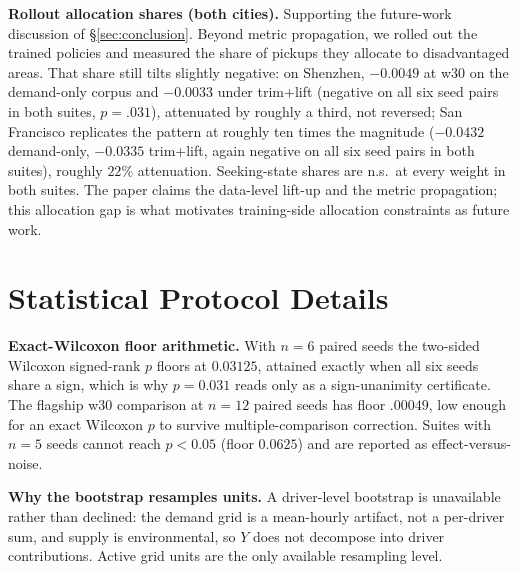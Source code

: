 \textbf{Rollout allocation shares (both cities).} Supporting the future-work
discussion of \S\ref{sec:conclusion}. Beyond metric propagation, we rolled
out the trained policies and measured the share of pickups they allocate to
disadvantaged areas. That share still tilts slightly negative: on Shenzhen,
$-0.0049$ at w30 on the demand-only corpus and $-0.0033$ under trim+lift
(negative on all six seed pairs in both suites, $p = .031$), attenuated by
roughly a third, not reversed; San Francisco replicates the pattern at
roughly ten times the magnitude ($-0.0432$ demand-only, $-0.0335$
trim+lift, again negative on all six seed pairs in both suites), roughly
$22\%$ attenuation. Seeking-state shares are n.s.\ at every weight in both
suites. The paper claims the data-level lift-up and the metric propagation;
this allocation gap is what motivates training-side allocation constraints
as future work.

\section{Statistical Protocol Details}\label{app:protocol}

\textbf{Exact-Wilcoxon floor arithmetic.} With $n = 6$ paired seeds the
two-sided Wilcoxon signed-rank $p$ floors at $0.03125$, attained exactly
when all six seeds share a sign, which is why $p = 0.031$ reads only as a
sign-unanimity certificate. The flagship w30 comparison at $n = 12$ paired
seeds has floor $.00049$, low enough for an exact Wilcoxon $p$ to survive
multiple-comparison correction. Suites with $n = 5$ seeds cannot reach
$p < 0.05$ (floor $0.0625$) and are reported as effect-versus-noise.

\textbf{Why the bootstrap resamples units.} A driver-level bootstrap is
unavailable rather than declined: the demand grid is a mean-hourly artifact,
not a per-driver sum, and supply is environmental, so $Y$ does not decompose
into driver contributions. Active grid units are the only available
resampling level.

